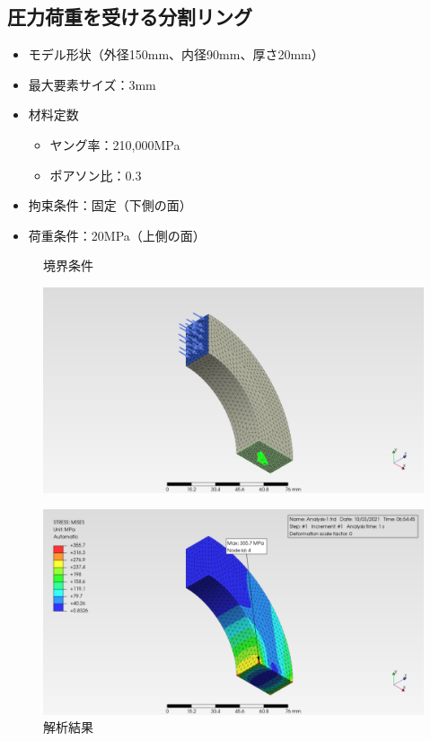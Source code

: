 \documentclass[a4j,20pt,slide]{ltjsarticle}
\begin{document}
\subsection{圧力荷重を受ける分割リング}
\begin{itemize}
	\item モデル形状（外径150mm、内径90mm、厚さ20mm）
	\item 最大要素サイズ：3mm
	\item 材料定数
	      \begin{itemize}
		      \item ヤング率：210,000MPa
		      \item ポアソン比：0.3
	      \end{itemize}
	\item 拘束条件：固定（下側の面）
	\item 荷重条件：20MPa（上側の面）
\end{itemize}
\vspace{-\baselineskip}
\begin{figure}[H]
	\begin{minipage}{.49\hsize}
		\caption{境界条件}
		\label{01-01}
		\centering
		\includegraphics[width=.95\columnwidth]{fig/01-01.png}
	\end{minipage}
	\begin{minipage}{.49\hsize}
		\caption{解析結果}
		\label{01-02}
		\centering
		\includegraphics[width=.95\columnwidth]{fig/01-02.png}
	\end{minipage}
\end{figure}
\clearpage
%
\end{document}
